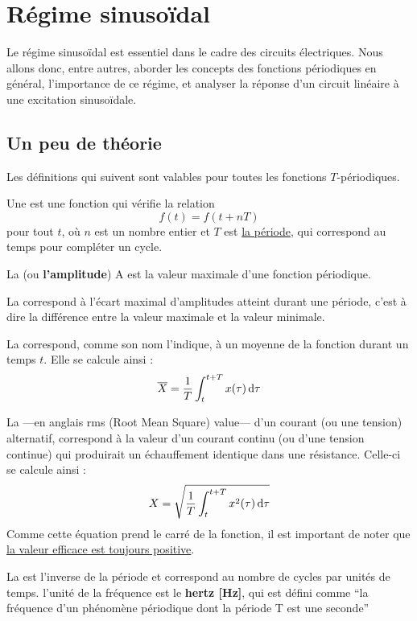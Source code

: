 \documentclass[12pt,a4paper]{article}
\begin{document}
\section{Régime sinusoïdal}
\label{sect: regime sinus}
\setcounter{equation}{0}
Le régime sinusoïdal est essentiel dans le cadre des circuits électriques. Nous allons donc, entre autres, aborder les concepts des fonctions périodiques en général, l'importance de ce régime, et analyser la réponse d'un circuit linéaire à une excitation sinusoïdale.

\subsection{Un peu de théorie}
\label{subsection: un peu de theorie}
Les définitions qui suivent sont valables pour toutes les fonctions $T$-périodiques.

Une  est une fonction qui vérifie la relation
\[f(t) = f(t+ nT)\]
pour tout $t$, où $n$ est un nombre entier et $T$ est \uline{la période}, qui correspond au temps pour compléter un cycle.

La  (ou \textbf{l'amplitude}) A est la valeur maximale d'une fonction périodique.

La  correspond à l'écart maximal d'amplitudes atteint durant une période, c'est à dire la différence entre la valeur maximale et la valeur minimale.

La  correspond, comme son nom l'indique, à un moyenne de la fonction durant un temps $t$. Elle se calcule ainsi :
\begin{equation}
	\overline{X} = \frac{1}{T}\int_t^{t+T} x(\tau) \, \mathrm d \tau	
	\label{equ: valeur moyenne}
\end{equation}

La  ---en anglais rms (Root Mean Square) value--- d'un courant (ou une tension) alternatif, correspond à la valeur d'un courant continu (ou d'une tension continue) qui produirait un échauffement identique dans une résistance. Celle-ci se calcule ainsi :
\begin{equation}
	X = \sqrt{\frac{1}{T}\int_t^{t+T} x^2(\tau) \, \mathrm d \tau}
\end{equation} 
Comme cette équation prend le carré de la fonction, il est important de noter que \uline{la valeur efficace est toujours positive}.

La  est l'inverse de la période et correspond au nombre de cycles par unités de temps. l'unité de la fréquence est le \textbf{hertz [Hz]}, qui est défini comme ``la fréquence d'un phénomène périodique dont la période T est une seconde''
\end{document}
